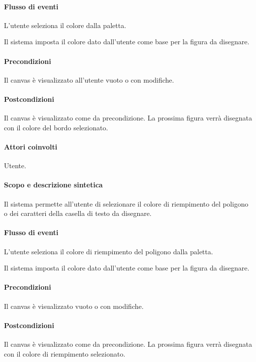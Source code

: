 \paragraph{Flusso di eventi}
\begin{elenconumerato}[\textbf{}]{\subsubsecindent}
\item L'utente seleziona il colore dalla paletta.
\item Il sistema imposta il colore dato dall'utente come base per la figura da disegnare.
\end{elenconumerato}
\paragraph{Precondizioni} Il canvas \`e visualizzato all'utente vuoto o con modifiche.
\paragraph{Postcondizioni} Il canvas \`e visualizzato come da precondizione. La prossima figura verr\` a disegnata con il colore del bordo selezionato.

\paragraph{Attori coinvolti} Utente.
\paragraph{Scopo e descrizione sintetica} 
Il sistema permette all'utente di selezionare il colore di riempimento del poligono o dei caratteri della casella di testo da disegnare.
\paragraph{Flusso di eventi}
\begin{elenconumerato}[\textbf{}]{\subsubsecindent}
\item L'utente seleziona il colore di riempimento del poligono dalla paletta.
\item Il sistema imposta il colore dato dall'utente come base per la figura da disegnare.
\end{elenconumerato}
\paragraph{Precondizioni} Il canvas \`e visualizzato vuoto o con modifiche.
\paragraph{Postcondizioni} Il canvas \`e visualizzato come da precondizione. La prossima figura verr\` a disegnata con il colore di riempimento selezionato.

